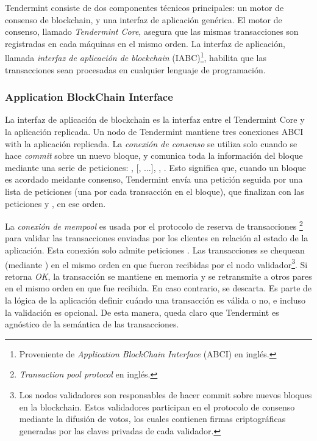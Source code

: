 Tendermint consiste de dos componentes técnicos principales: un motor de consenso de blockchain, y una interfaz
de aplicación genérica.
%
El motor de consenso, llamado \textit{Tendermint Core}, asegura que las mismas transacciones son registradas en cada
máquinas en el mismo orden.
%
La interfaz de aplicación, llamada \textit{interfaz de aplicación de blockchain} (IABC)\footnote{Proveniente de \textit{Application
BlockChain Interface} (ABCI) en inglés.}, habilita que las transacciones
sean procesadas en cualquier lenguaje de programación.

\subsubsection{Application BlockChain Interface}\label{subsec:abci}
La interfaz de aplicación de blockchain es la interfaz entre el Tendermint Core y la aplicación replicada.
%
Un nodo de Tendermint mantiene tres conexiones ABCI with la aplicación replicada.
%
La \textit{conexión de consenso} se utiliza solo cuando se hace \textit{commit} sobre un nuevo bloque,
y comunica toda la información del bloque mediante una serie de peticiones: 
\BeginBlock, [\DeliverTx, ...], \EndBlock, \Commit.
%
Esto significa que, cuando un bloque es acordado meidante consenso, Tendermint envía una petición \BeginBlock
seguida por una lista de peticiones \DeliverTx (una por cada transacción en el bloque), que finalizan con las
peticiones \EndBlock y \Commit, en ese orden.

%

La \textit{conexión de mempool} es usada por el protocolo de reserva de transacciones \footnote{\textit{Transaction pool protocol}
en inglés.} para validar las transacciones enviadas por los clientes en relación al estado de la aplicación.
%
Esta conexión solo admite peticiones \CheckTx. Las transacciones se chequean (mediante \CheckTx) en el mismo orden
en que fueron recibidas por el nodo validador\footnote{Los nodos validadores son responsables de hacer commit sobre nuevos
bloques en la blockchain. Estos validadores participan en el protocolo de consenso mediante la difusión de votos, los
cuales contienen firmas criptográficas generadas por las claves privadas de cada validador.}.
%
Si \CheckTx retorna \textit{OK}, la transacción se mantiene en memoria y se retransmite a otros pares en el mismo orden
en que fue recibida.
%
En caso contrario, se descarta.
%
Es parte de la lógica de la aplicación definir cuándo una transacción es válida o no, e incluso la validación es opcional.
%
De esta manera, queda claro que Tendermint es agnóstico de la semántica de las transacciones.

